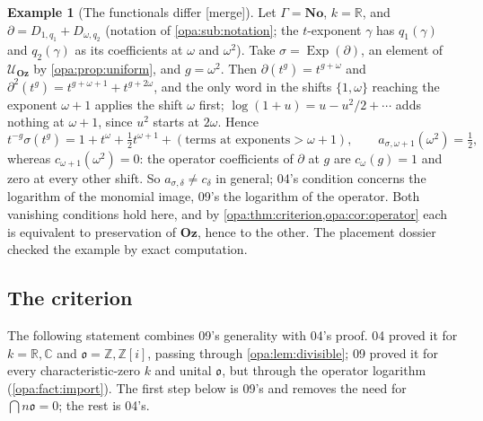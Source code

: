 \documentclass[11pt,oneside]{article}
\numberwithin{equation}{section}
\theoremstyle{definition}
\newtheorem{example}[example]{Example}
\theoremstyle{remark}
\newcommand{\No}{\mathbf{No}}
\newcommand{\Oz}{\mathbf{Oz}}
\newcommand{\R}{\mathbb R}
\newcommand{\C}{\mathbb C}
\newcommand{\Z}{\mathbb Z}
\newcommand{\oo}{\mathfrak o}
\newcommand{\UU}{\mathcal U}
\newcommand{\Exp}{\operatorname{Exp}}
\newcommand{\mergetag}{\textup{\textsf{\small[merge]}}}
\begin{document}
\begin{example}[The functionals differ \mergetag]\label{opa:ex:functionals}
Let $\Gamma=\No$, $k=\R$, and
$\partial=D_{1,q_1}+D_{\omega,q_2}$ (notation of
\cref{opa:sub:notation}; the $t$-exponent $\gamma$ has $q_1(\gamma)$ and
$q_2(\gamma)$ as its coefficients at $\omega$ and $\omega^2$). Take
$\sigma=\Exp(\partial)$, an element of $\UU_\Oz$ by
\cref{opa:prop:uniform}, and $g=\omega^2$. Then
$\partial(t^g)=t^{g+\omega}$ and
$\partial^2(t^g)=t^{g+\omega+1}+t^{g+2\omega}$, and the only word in the
shifts $\{1,\omega\}$ reaching the exponent $\omega+1$ applies the shift
$\omega$ first; $\log(1+u)=u-u^2/2+\cdots$ adds nothing at $\omega+1$, since
$u^2$ starts at $2\omega$. Hence
\[
 t^{-g}\sigma(t^g)=1+t^\omega+\tfrac12t^{\omega+1}+(\text{terms at exponents}>\omega+1),
 \qquad a_{\sigma,\omega+1}(\omega^2)=\tfrac12,
\]
whereas $c_{\omega+1}(\omega^2)=0$: the operator coefficients of $\partial$ at
$g$ are $c_\omega(g)=1$ and zero at every other shift. So
$a_{\sigma,\delta}\ne c_\delta$ in general; 04's condition concerns the
logarithm of the monomial image, 09's the logarithm of the operator. Both
vanishing conditions hold here, and by
\cref{opa:thm:criterion,opa:cor:operator} each is equivalent to preservation
of $\Oz$, hence to the other. The placement dossier checked the example by
exact computation.
\end{example}

\subsection{The criterion}

The following statement combines 09's generality with 04's proof. 04 proved
it for $k=\R,\C$ and $\oo=\Z,\Z[i]$, passing through \cref{opa:lem:divisible};
09 proved it for every characteristic-zero $k$ and unital $\oo$, but through
the operator logarithm (\cref{opa:fact:import}). The first step below is 09's
and removes the need for $\bigcap n\oo=0$; the rest is 04's.
\end{document}
